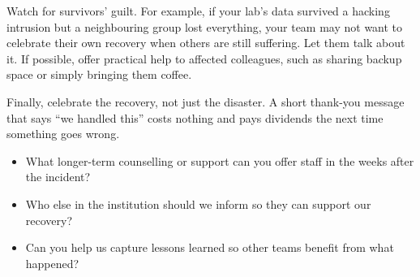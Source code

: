 \documentclass[10pt,letterpaper]{article}
\begin{document}
Watch for survivors' guilt.  For example, if your lab's data survived a hacking
intrusion but a neighbouring group lost everything, your team may not want to
celebrate their own recovery when others are still suffering.  Let them talk
about it. If possible, offer practical help to affected colleagues, such as
sharing backup space or simply bringing them coffee.

Finally, celebrate the recovery, not just the disaster. A short thank-you
message that says ``we handled this'' costs nothing and pays dividends the next
time something goes wrong.

\begin{notebox}
  \begin{itemize}
  \item What longer-term counselling or support can you offer staff in the weeks
    after the incident?
  \item Who else in the institution should we inform so they can support our
    recovery?
  \item Can you help us capture lessons learned so other teams benefit from what
    happened?
  \end{itemize}
\end{notebox}

\nocite{*}

\end{document}
